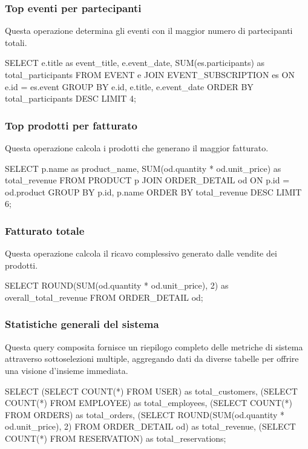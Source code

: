 \documentclass[a4paper,12pt]{report}
\begin{document}
\subsubsection{Top eventi per partecipanti} 
Questa operazione determina gli eventi con il maggior numero di partecipanti totali.

\begin{sqlcode}[caption={Query per gli eventi più partecipati}]
SELECT e.title as event_title, e.event_date, SUM(es.participants) as total_participants 
FROM EVENT e 
JOIN EVENT_SUBSCRIPTION es ON e.id = es.event 
GROUP BY e.id, e.title, e.event_date 
ORDER BY total_participants DESC 
LIMIT 4;
\end{sqlcode}

\subsubsection{Top prodotti per fatturato} 
Questa operazione calcola i prodotti che generano il maggior fatturato.

\begin{sqlcode}[caption={Query per i prodotti per fatturato}]
SELECT p.name as product_name, SUM(od.quantity * od.unit_price) as total_revenue 
FROM PRODUCT p 
JOIN ORDER_DETAIL od ON p.id = od.product 
GROUP BY p.id, p.name 
ORDER BY total_revenue DESC 
LIMIT 6;
\end{sqlcode}

\subsubsection{Fatturato totale} 
Questa operazione calcola il ricavo complessivo generato dalle vendite dei prodotti.

\begin{sqlcode}[caption={Query per il fatturato totale}]
SELECT ROUND(SUM(od.quantity * od.unit_price), 2) as overall_total_revenue 
FROM ORDER_DETAIL od;
\end{sqlcode}

\subsubsection{Statistiche generali del sistema} 
Questa query composita fornisce un riepilogo completo delle metriche di sistema attraverso sottoselezioni multiple, aggregando dati da diverse tabelle per offrire una visione d'insieme immediata.

\begin{sqlcode}[caption={Query per le statistiche generali}]
SELECT (SELECT COUNT(*) FROM USER) as total_customers,
       (SELECT COUNT(*) FROM EMPLOYEE) as total_employees,
       (SELECT COUNT(*) FROM ORDERS) as total_orders,
       (SELECT ROUND(SUM(od.quantity * od.unit_price), 2) FROM ORDER_DETAIL od) as total_revenue,
       (SELECT COUNT(*) FROM RESERVATION) as total_reservations;
\end{sqlcode}
\end{document}

